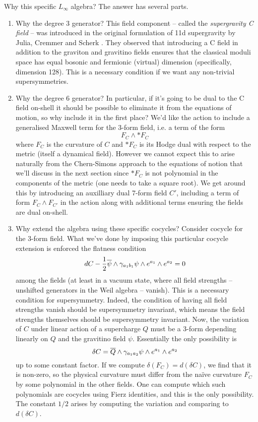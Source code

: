 \documentclass[10pt, oneside]{article}
\begin{document}
Why this specific $L_\infty$ algebra?  The answer has several parts.
\vspace{-8pt}
\begin{enumerate}
 \item Why the degree 3 generator?  This field component -- called the \emph{supergravity C field} -- was introduced in the original formulation of 11d supergravity by Julia, Cremmer and Scherk \cite{CJS}.  They observed that introducing a C field in addition to the graviton and gravitino fields ensures that the classical moduli space has equal bosonic and fermionic (virtual) dimension (specifically, dimension 128).  This is a necessary condition if we want any non-trivial supersymmetries.
 \item Why the degree 6 generator?  In particular, if it's going to be dual to the C field on-shell it should be possible to eliminate it from the equations of motion, so why include it in the first place?  We'd like the action to include a generalised Maxwell term for the 3-form field, i.e. a term of the form
 \[F_C \wedge \ast F_C\]
 where $F_C$ is the curvature of $C$ and $\ast F_C$ is its Hodge dual with respect to the metric (itself a dynamical field).  However we cannot expect this to arise naturally from the Chern-Simons approach to the equations of notion that we'll discuss in the next section since $\ast F_C$ is not polynomial in the components of the metric (one needs to take a square root).  We get around this by introducing an auxilliary dual 7-form field $C'$, including a term of form $F_C \wedge F_{C'}$ in the action along with additional terms ensuring the fields are dual on-shell.
 \item Why extend the algebra using these specific cocycles?  Consider cocycle for the 3-form field.  What we've done by imposing this particular cocycle extension is enforced the flatness condition
 \[dC- \frac 12 \overline{\psi} \wedge \gamma_{a_1 b_1} \psi \wedge e^{a_1} \wedge e^{a_2} = 0\]
 among the fields (at least in a vacuum state, where all field strengths -- unshifted generators in the Weil algebra -- vanish).  This is a necessary condition for supersymmetry.  Indeed, the condition of having all field strengths vanish should be supersymmetry invariant, which means the field strengths themselves should be supersymmetry invariant.  Now, the variation of $C$ under linear action of a supercharge $Q$ must be a 3-form depending linearly on $Q$ and the gravitino field $\psi$.  Essentially the only possibility is
 \[\delta C = \overline{Q} \wedge \gamma_{a_1 a_2} \psi \wedge e^{a_1} \wedge e^{a_2}\]
 up to some constant factor.  If we compute $\delta(F_C) = d(\delta C)$, we find that it is non-zero, so the physical curvature must differ from the na\"ive curvature $F_C$ by some polynomial in the other fields.  One can compute which such polynomials are cocycles using Fierz identities, and this is the only possibility.  The constant $1/2$ arises by computing the variation and comparing to $d(\delta C)$.

\end{enumerate}
\end{document}
